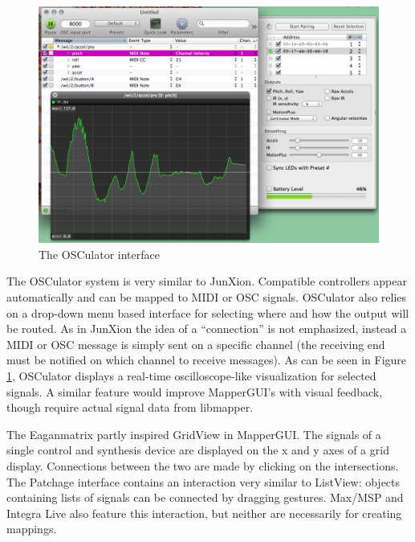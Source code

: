 \begin{figure}[h]
	\centering
		\includegraphics[width=\textwidth]{figures/osculator}
		\caption{The OSCulator interface}
		\label{fig:osculator}
\end{figure}

The OSCulator system \cite{osculator} is very similar to JunXion. Compatible controllers appear automatically and can be mapped to MIDI or OSC signals. OSCulator also relies on a drop-down menu based interface for selecting where and how the output will be routed. As in JunXion the idea of a ``connection'' is not emphasized, instead a MIDI or OSC message is simply sent on a specific channel (the receiving end must be notified on which channel to receive messages). As can be seen in Figure \ref{fig:osculator}, OSCulator displays a real-time oscilloscope-like visualization for selected signals. A similar feature would improve MapperGUI's with visual feedback, though require actual signal data from libmapper.

The Eaganmatrix \cite{eaganmatrix} partly inspired GridView in MapperGUI. The signals of a single control and synthesis device are displayed on the x and y axes of a grid display. Connections between the two are made by clicking on the intersections. The Patchage interface \cite{patchage} contains an interaction very similar to ListView: objects containing lists of signals can be connected by dragging gestures. Max/MSP and Integra Live \cite{integra} also feature this interaction, but neither are necessarily for creating mappings. 



